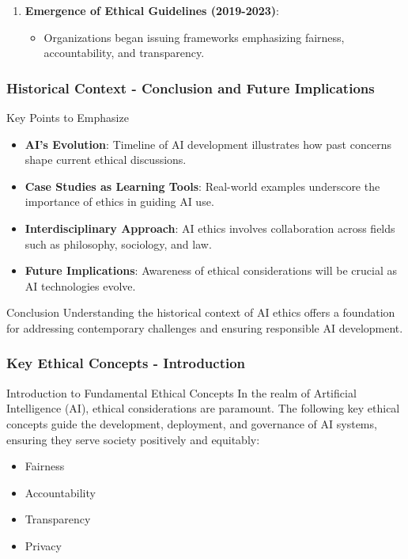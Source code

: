 \documentclass[aspectratio=169]{beamer}
\begin{document}
\begin{frame}[fragile]
\begin{enumerate}
        \item \textbf{Emergence of Ethical Guidelines (2019-2023)}:
            \begin{itemize}
                \item Organizations began issuing frameworks emphasizing fairness, accountability, and transparency.
            \end{itemize}
    \end{enumerate}
\end{frame}

\begin{frame}[fragile]
    \frametitle{Historical Context - Conclusion and Future Implications}
    \begin{block}{Key Points to Emphasize}
        \begin{itemize}
            \item \textbf{AI's Evolution}: Timeline of AI development illustrates how past concerns shape current ethical discussions.
            \item \textbf{Case Studies as Learning Tools}: Real-world examples underscore the importance of ethics in guiding AI use.
            \item \textbf{Interdisciplinary Approach}: AI ethics involves collaboration across fields such as philosophy, sociology, and law.
            \item \textbf{Future Implications}: Awareness of ethical considerations will be crucial as AI technologies evolve.
        \end{itemize}
    \end{block}

    \begin{block}{Conclusion}
        Understanding the historical context of AI ethics offers a foundation for addressing contemporary challenges and ensuring responsible AI development.
    \end{block}
\end{frame}

\begin{frame}[fragile]
    \frametitle{Key Ethical Concepts - Introduction}
    \begin{block}{Introduction to Fundamental Ethical Concepts}
        In the realm of Artificial Intelligence (AI), ethical considerations are paramount. The following key ethical concepts guide the development, deployment, and governance of AI systems, ensuring they serve society positively and equitably:
    \end{block}
    \begin{itemize}
        \item Fairness
        \item Accountability
        \item Transparency
        \item Privacy
    \end{itemize}
\end{frame}
\end{document}
